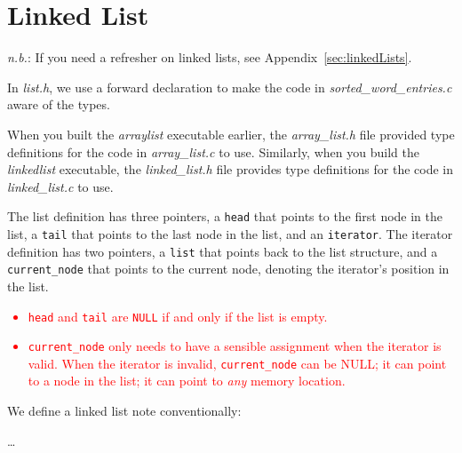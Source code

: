 \section{Linked List} \label{sec:LinkedList}

\textit{n.b.}: If you need a refresher on linked lists, see Appendix~\ref{sec:linkedLists}.

In \textit{list.h}, we use a forward declaration to make the code in \textit{sorted\_word\_entries.c} aware of the types.




When you built the \textit{arraylist} executable earlier, the \textit{array\_list.h} file provided type definitions for the code in \textit{array\_list.c} to use.
Similarly, when you build the \textit{linkedlist} executable, the \textit{linked\_list.h} file provides type definitions for the code in \textit{linked\_list.c} to use.




The list definition has three pointers, a \lstinline{head} that points to the first node in the list, a \lstinline{tail} that points to the last node in the list, and an \lstinline{iterator}.
The iterator definition has two pointers, a \lstinline{list} that points back to the list structure, and a \lstinline{current_node} that points to the current node, denoting the iterator's position in the list.
\textcolor{red}{
    \begin{itemize}
        \item \lstinline{head} and \lstinline{tail} are \lstinline{NULL} if and only if the list is empty.
        \item \lstinline{current_node} only needs to have a sensible assignment when the iterator is valid.
            When the iterator is invalid, \lstinline{current_node} can be NULL; it can point to a node in the list; it can point to \textit{any} memory location.
    \end{itemize}
}

We define a linked list note conventionally:


\dots


